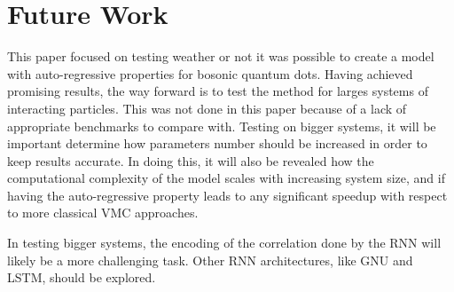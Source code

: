 \section{Future Work}
This paper focused on testing weather or not it was possible to create a model with auto-regressive properties for bosonic quantum dots. Having achieved promising results, the way forward is to test the method for larges systems of interacting particles. This was not done in this paper because of a lack of appropriate benchmarks to compare with. Testing on bigger systems, it will be important determine how parameters number should be increased in order to keep results accurate. In doing this, it will also be revealed how the computational complexity of the model scales with increasing system size, and if having the auto-regressive property leads to any significant speedup with respect to more classical VMC approaches.

In testing bigger systems, the encoding of the correlation done by the RNN will likely be a more challenging task. Other RNN architectures, like GNU and LSTM, should be explored.
